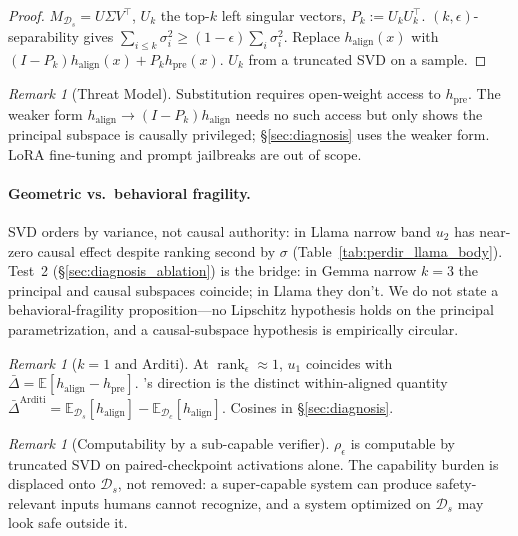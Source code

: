 \documentclass[10pt]{article}
\theoremstyle{definition}
\theoremstyle{remark}
\newtheorem{remark}[theorem]{Remark}
\begin{document}
\begin{proof}
$M_{\mathcal{D}_s} = U \Sigma V^\top$, $U_k$ the top-$k$
left singular vectors, $P_k := U_k U_k^\top$.
$(k,\epsilon)$-separability gives $\sum_{i\leq k}\sigma_i^2
\geq (1-\epsilon)\sum_i \sigma_i^2$.  Replace
$h_{\mathrm{align}}(x)$ with $(I-P_k) h_{\mathrm{align}}(x)
+ P_k h_{\mathrm{pre}}(x)$.  $U_k$ from a truncated SVD
on a sample.
\end{proof}

\begin{remark}[Threat Model]
\label{rem:threat_model}
Substitution requires open-weight access to
$h_{\mathrm{pre}}$.  The weaker form
$h_{\mathrm{align}} \to (I-P_k) h_{\mathrm{align}}$
needs no such access but only shows the principal
subspace is causally privileged; \S\ref{sec:diagnosis}
uses the weaker form.  LoRA fine-tuning and prompt
jailbreaks are out of scope.
\end{remark}

\paragraph{Geometric vs.\ behavioral fragility.}
SVD orders by variance, not causal authority: in
Llama narrow band $u_2$ has near-zero causal
effect despite ranking second by $\sigma$
(Table~\ref{tab:perdir_llama_body}).  Test~2
(\S\ref{sec:diagnosis_ablation}) is the bridge: in
Gemma narrow $k=3$ the principal and causal subspaces
coincide; in Llama they don't.  We do not state a
behavioral-fragility proposition---no Lipschitz
hypothesis holds on the principal parametrization, and
a causal-subspace hypothesis is empirically circular.

\begin{remark}[$k=1$ and Arditi]
\label{rem:k1_arditi}
At $\operatorname{rank}_{\epsilon}\approx 1$, $u_1$
coincides with $\bar{\Delta} = \mathbb{E}[h_{\mathrm{align}}
- h_{\mathrm{pre}}]$.  \citet{arditi2024refusal}'s
direction is the distinct within-aligned quantity
$\bar{\Delta}^{\mathrm{Arditi}} =
\mathbb{E}_{\mathcal{D}_s}[h_{\mathrm{align}}] -
\mathbb{E}_{\mathcal{D}_c}[h_{\mathrm{align}}]$.
Cosines in \S\ref{sec:diagnosis}.
\end{remark}

\begin{remark}[Computability by a sub-capable verifier]
\label{rem:bootstrap}
$\rho_{\epsilon}$ is computable by truncated SVD on
paired-checkpoint activations alone.  The capability
burden is displaced onto $\mathcal{D}_s$, not removed:
a super-capable system can produce safety-relevant
inputs humans cannot recognize, and a system optimized
on $\mathcal{D}_s$ may look safe outside it.
\end{remark}
\end{document}
